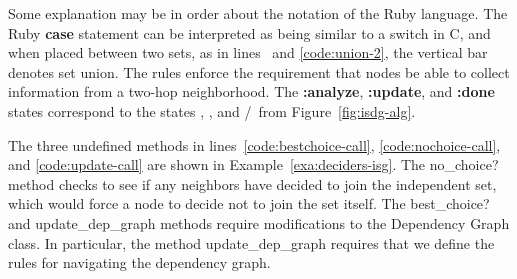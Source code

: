 Some explanation may be in order about the notation of the Ruby language. The Ruby {\bfseries case} statement can be interpreted as being similar to a switch in C, and when placed between two sets, as in lines~ and \ref{code:union-2}, the vertical bar denotes set union. The rules enforce the requirement that nodes be able to collect information from a two-hop neighborhood. The {\bfseries :analyze}, {\bfseries :update}, and {\bfseries :done} states correspond to the states \cAd, \cUd, and \cId/\cOd\ from Figure~\ref{fig:isdg-alg}. 

The three undefined methods in lines~\ref{code:bestchoice-call}, \ref{code:nochoice-call}, and \ref{code:update-call} are shown in Example~\ref{exa:deciders-isg}. The {\ttfamily no\_choice?} method checks to see if any neighbors have decided to join the independent set, which would force a node to decide not to join the set itself. The {\ttfamily best\_choice?} and {\ttfamily update\_dep\_graph} methods require modifications to the Dependency Graph class. In particular, the method {\ttfamily update\_dep\_graph} requires that we define the rules for navigating the dependency graph. 



